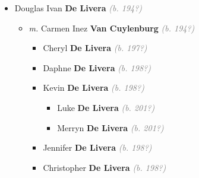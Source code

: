 \documentclass[10pt, openany]{book}
\begin{document}
\begin{itemize}
{\begin{itemize}
{\begin{itemize}
\item{\textit{m.} Vernon \textbf{Abeysinghe} \textcolor{gray}{\textit{(b. 193?)}}   \label{couple:00001227:00002330} \begin{itemize}
\item{Dharshani \textbf{Abeysinghe} \textcolor{gray}{\textit{(b. 196?)}}
\begin{itemize}
\item{\textit{m.} Janaka \textbf{Goonetilleke} \textcolor{gray}{\textit{(b. 196?)}}   \label{couple:00002331:00002332} \begin{itemize}
\item{Ranil \textbf{Goonetilleke} \textcolor{gray}{\textit{(b. 199?)}}
 }
\item{Prasanna \textbf{Goonetilleke} \textcolor{gray}{\textit{(b. 199?)}}
 }
\end{itemize}}
\end{itemize}
 }
\end{itemize}}
\end{itemize}
  }
\item{Douglas Ivan \textbf{De Livera} \textcolor{gray}{\textit{(b. 194?)}}
\begin{itemize}
\item{\textit{m.} Carmen Inez \textbf{Van Cuylenburg} \textcolor{gray}{\textit{(b. 194?)}}   \label{couple:00002335:00002336} \begin{itemize}
\item{Cheryl \textbf{De Livera} \textcolor{gray}{\textit{(b. 197?)}}
  }
\item{Daphne \textbf{De Livera} \textcolor{gray}{\textit{(b. 198?)}}
  }
\item{Kevin \textbf{De Livera} \textcolor{gray}{\textit{(b. 198?)}}
\begin{itemize}
\item{Luke \textbf{De Livera} \textcolor{gray}{\textit{(b. 201?)}}
  }
\item{Merryn \textbf{De Livera} \textcolor{gray}{\textit{(b. 201?)}}
  }
\end{itemize}
  }
\item{Jennifer \textbf{De Livera} \textcolor{gray}{\textit{(b. 198?)}}
  }
\item{Christopher \textbf{De Livera} \textcolor{gray}{\textit{(b. 198?)}}
  }
\end{itemize}}
\end{itemize}
   }
\end{itemize}}
\end{itemize}
  
\end{document}
